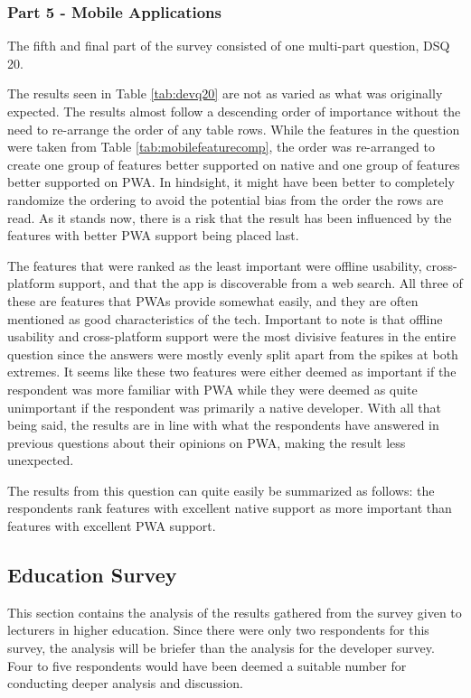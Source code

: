 \documentclass[a4paper,12pt]{article}
\begin{document}
\subsubsection{Part 5 - Mobile Applications}
\label{Analysis_devSurvey_part5}
The fifth and final part of the survey consisted of one multi-part question, DSQ 20.

The results seen in Table \ref{tab:devq20} are not as varied as what was originally expected. The results almost follow a descending order of importance without the need to re-arrange the order of any table rows. While the features in the question were taken from Table \ref{tab:mobilefeaturecomp}, the order was re-arranged to create one group of features better supported on native and one group of features better supported on PWA. In hindsight, it might have been better to completely randomize the ordering to avoid the potential bias from the order the rows are read. As it stands now, there is a risk that the result has been influenced by the features with better PWA support being placed last.

The features that were ranked as the least important were offline usability, cross-platform support, and that the app is discoverable from a web search. All three of these are features that PWAs provide somewhat easily, and they are often mentioned as good characteristics of the tech. Important to note is that offline usability and cross-platform support were the most divisive features in the entire question since the answers were mostly evenly split apart from the spikes at both extremes. It seems like these two features were either deemed as important if the respondent was more familiar with PWA while they were deemed as quite unimportant if the respondent was primarily a native developer. With all that being said, the results are in line with what the respondents have answered in previous questions about their opinions on PWA, making the result less unexpected. 

The results from this question can quite easily be summarized as follows: the respondents rank features with excellent native support as more important than features with excellent PWA support.


\subsection{Education Survey}
\label{Analysis_eduSurvey}
This section contains the analysis of the results gathered from the survey given to lecturers in higher education. Since there were only two respondents for this survey, the analysis will be briefer than the analysis for the developer survey. Four to five respondents would have been deemed a suitable number for conducting deeper analysis and discussion. 
\end{document}
